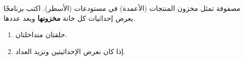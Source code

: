 \begin{statement}
مصفوفة  تمثل مخزون المنتجات (الأعمدة) في  مستودعات (الأسطر). اكتب برنامجًا يعرض إحداثيات كل خانة \textbf{مخزونها } ويعد عددها.
\end{statement}
\begin{stepsbox}\begin{enumerate}
\item حلقتان متداخلتان.
\item إذا كان  نعرض الإحداثيتين ونزيد العداد.
\end{enumerate}\end{stepsbox}

